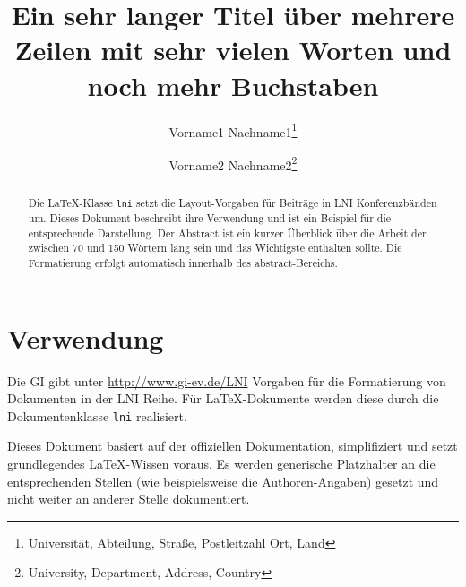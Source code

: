 \documentclass[utf8,biblatex]{lni}
\begin{document}
\title[Ein Kurztitel]{Ein sehr langer Titel über mehrere Zeilen mit sehr vielen Worten und noch mehr Buchstaben}
\author[Vorname1 Nachname1 \and Vorname2 Nachname2]
{Vorname1 Nachname1\footnote{Universität, Abteilung, Straße, Postleitzahl Ort, Land } \and
 Vorname2 Nachname2\footnote{University, Department, Address, Country }}
\maketitle

\begin{abstract}
Die \LaTeX-Klasse \texttt{lni} setzt die Layout-Vorgaben für Beiträge in LNI Konferenzbänden um.
Dieses Dokument beschreibt ihre Verwendung und ist ein Beispiel für die entsprechende Darstellung.
Der Abstract ist ein kurzer Überblick über die Arbeit der zwischen 70 und 150 Wörtern lang sein und das Wichtigste enthalten sollte.
Die Formatierung erfolgt automatisch innerhalb des abstract-Bereichs.
\end{abstract}


\section{Verwendung}
Die GI gibt unter \url{http://www.gi-ev.de/LNI} Vorgaben für die Formatierung von Dokumenten in der LNI Reihe.
Für \LaTeX-Dokumente werden diese durch die Dokumentenklasse \texttt{lni} realisiert.

Dieses Dokument basiert auf der offiziellen Dokumentation, simplifiziert und setzt grundlegendes LaTeX-Wissen voraus.
Es werden generische Platzhalter an die entsprechenden Stellen (wie beispielsweise die Authoren-Angaben) gesetzt und nicht weiter an anderer Stelle dokumentiert.
\end{document}
